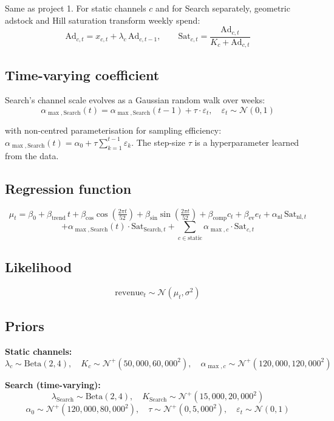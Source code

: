 \documentclass[a4paper,11pt]{article}
\begin{document}
Same as project 1. For static channels $c$ and for Search separately,
geometric adstock and Hill saturation transform weekly spend:
$$\text{Ad}_{c,t} = x_{c,t} + \lambda_c \, \text{Ad}_{c,t-1}, \qquad \text{Sat}_{c,t} = \frac{\text{Ad}_{c,t}}{K_c + \text{Ad}_{c,t}}$$

\subsection{Time-varying coefficient}

Search's channel scale evolves as a Gaussian random walk over weeks:
$$\alpha_{\max, \text{Search}}(t) = \alpha_{\max, \text{Search}}(t - 1) + \tau \cdot \varepsilon_t, \quad \varepsilon_t \sim \mathcal{N}(0, 1)$$

with non-centred parameterisation for sampling efficiency:
$\alpha_{\max, \text{Search}}(t) = \alpha_{0} + \tau \sum_{k=1}^{t-1} \varepsilon_k$.
The step-size $\tau$ is a hyperparameter learned from the data.

\subsection{Regression function}

$$\mu_t = \beta_0 + \beta_{\text{trend}} \, t + \beta_{\cos} \cos\!\left(\tfrac{2\pi t}{52}\right) + \beta_{\sin} \sin\!\left(\tfrac{2\pi t}{52}\right) + \beta_{\text{comp}} c_t + \beta_{\text{ev}} e_t + \alpha_{\text{nl}} \, \text{Sat}_{\text{nl},t}$$
$$+ \alpha_{\max, \text{Search}}(t) \cdot \text{Sat}_{\text{Search},t} + \sum_{c \in \text{static}} \alpha_{\max, c} \cdot \text{Sat}_{c, t}$$

\subsection{Likelihood}

$$\text{revenue}_t \sim \mathcal{N}(\mu_t, \sigma^2)$$

\subsection{Priors}

\textbf{Static channels:}
$$\lambda_c \sim \text{Beta}(2, 4), \quad K_c \sim \mathcal{N}^{+}(50{,}000, 60{,}000^2), \quad \alpha_{\max, c} \sim \mathcal{N}^{+}(120{,}000, 120{,}000^2)$$

\textbf{Search (time-varying):}
$$\lambda_{\text{Search}} \sim \text{Beta}(2, 4), \quad K_{\text{Search}} \sim \mathcal{N}^{+}(15{,}000, 20{,}000^2)$$
$$\alpha_0 \sim \mathcal{N}^{+}(120{,}000, 80{,}000^2), \quad \tau \sim \mathcal{N}^{+}(0, 5{,}000^2), \quad \varepsilon_t \sim \mathcal{N}(0, 1)$$
\end{document}
